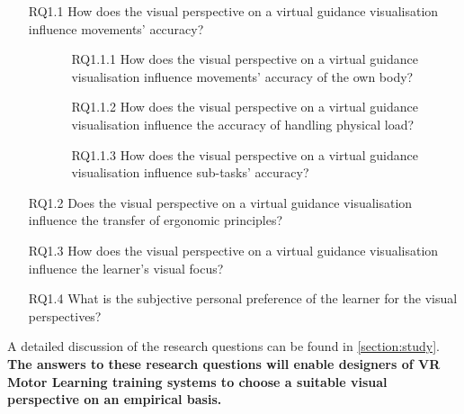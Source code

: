 \begin{enumerate}[align=left, leftmargin=0pt, labelindent=\parindent,
	listparindent=\parindent, labelwidth=0pt, itemindent=!]
	\item[RQ1.1] How does the visual perspective on a virtual guidance visualisation influence movements' accuracy?
	\begin{itemize}
		\item[] \begin{itemize}
			\item[RQ1.1.1] How does the visual perspective on a virtual guidance visualisation influence movements' accuracy of the own body?
			\item[RQ1.1.2] How does the visual perspective on a virtual guidance visualisation influence the accuracy of handling physical load?
			\item[RQ1.1.3] How does the visual perspective on a virtual guidance visualisation influence sub-tasks' accuracy?
		\end{itemize}
	\end{itemize}
	
	\item[RQ1.2] Does the visual perspective on a virtual guidance visualisation influence the transfer of ergonomic principles?
	\item[RQ1.3] How does the visual perspective on a virtual guidance visualisation influence the learner's visual focus?
	\item[RQ1.4] What is the subjective personal preference of the learner for the visual perspectives?
\end{enumerate}
A detailed discussion of the research questions can be found in \ref{section:study}.\\
\textbf{The answers to these research questions will enable designers of VR Motor Learning training systems to choose a suitable visual perspective on an empirical basis.}

